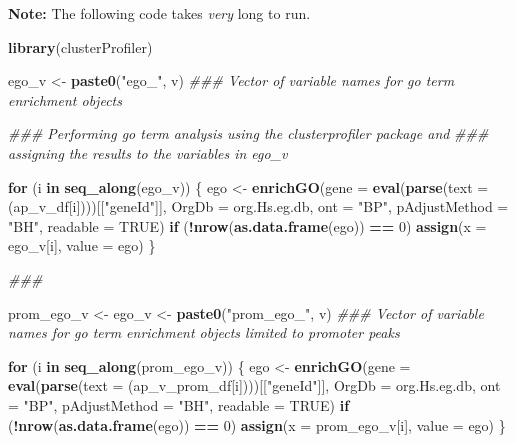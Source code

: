 \documentclass[]{article}
\newenvironment{Shaded}{\begin{snugshade}}{\end{snugshade}}
\newcommand{\CommentTok}[1]{\textcolor[rgb]{0.56,0.35,0.01}{\textit{#1}}}
\newcommand{\ControlFlowTok}[1]{\textcolor[rgb]{0.13,0.29,0.53}{\textbf{#1}}}
\newcommand{\DataTypeTok}[1]{\textcolor[rgb]{0.13,0.29,0.53}{#1}}
\newcommand{\DecValTok}[1]{\textcolor[rgb]{0.00,0.00,0.81}{#1}}
\newcommand{\KeywordTok}[1]{\textcolor[rgb]{0.13,0.29,0.53}{\textbf{#1}}}
\newcommand{\NormalTok}[1]{#1}
\newcommand{\OperatorTok}[1]{\textcolor[rgb]{0.81,0.36,0.00}{\textbf{#1}}}
\newcommand{\OtherTok}[1]{\textcolor[rgb]{0.56,0.35,0.01}{#1}}
\newcommand{\StringTok}[1]{\textcolor[rgb]{0.31,0.60,0.02}{#1}}
\begin{document}
\textbf{Note:} The following code takes \emph{very} long to run.

\begin{Shaded}
\begin{Highlighting}[]
\KeywordTok{library}\NormalTok{(clusterProfiler)}


\NormalTok{ego_v <-}\StringTok{ }\KeywordTok{paste0}\NormalTok{(}\StringTok{"ego_"}\NormalTok{, v)  }\CommentTok{### Vector of variable names for go term enrichment objects}

\CommentTok{### Performing go term analysis using the clusterprofiler package and}
\CommentTok{### assigning the results to the variables in ego_v}

\ControlFlowTok{for}\NormalTok{ (i }\ControlFlowTok{in} \KeywordTok{seq_along}\NormalTok{(ego_v)) \{}
\NormalTok{    ego <-}\StringTok{ }\KeywordTok{enrichGO}\NormalTok{(}\DataTypeTok{gene =} \KeywordTok{eval}\NormalTok{(}\KeywordTok{parse}\NormalTok{(}\DataTypeTok{text =}\NormalTok{ (ap_v_df[i])))[[}\StringTok{"geneId"}\NormalTok{]], }\DataTypeTok{OrgDb =}\NormalTok{ org.Hs.eg.db, }
        \DataTypeTok{ont =} \StringTok{"BP"}\NormalTok{, }\DataTypeTok{pAdjustMethod =} \StringTok{"BH"}\NormalTok{, }\DataTypeTok{readable =} \OtherTok{TRUE}\NormalTok{)}
    \ControlFlowTok{if}\NormalTok{ (}\OperatorTok{!}\KeywordTok{nrow}\NormalTok{(}\KeywordTok{as.data.frame}\NormalTok{(ego)) }\OperatorTok{==}\StringTok{ }\DecValTok{0}\NormalTok{) }
        \KeywordTok{assign}\NormalTok{(}\DataTypeTok{x =}\NormalTok{ ego_v[i], }\DataTypeTok{value =}\NormalTok{ ego)}
\NormalTok{\}}


\CommentTok{### }

\NormalTok{prom_ego_v <-}\StringTok{ }\NormalTok{ego_v <-}\StringTok{ }\KeywordTok{paste0}\NormalTok{(}\StringTok{"prom_ego_"}\NormalTok{, v)  }\CommentTok{### Vector of variable names for go term enrichment objects limited to promoter peaks}



\ControlFlowTok{for}\NormalTok{ (i }\ControlFlowTok{in} \KeywordTok{seq_along}\NormalTok{(prom_ego_v)) \{}
\NormalTok{    ego <-}\StringTok{ }\KeywordTok{enrichGO}\NormalTok{(}\DataTypeTok{gene =} \KeywordTok{eval}\NormalTok{(}\KeywordTok{parse}\NormalTok{(}\DataTypeTok{text =}\NormalTok{ (ap_v_prom_df[i])))[[}\StringTok{"geneId"}\NormalTok{]], }
        \DataTypeTok{OrgDb =}\NormalTok{ org.Hs.eg.db, }\DataTypeTok{ont =} \StringTok{"BP"}\NormalTok{, }\DataTypeTok{pAdjustMethod =} \StringTok{"BH"}\NormalTok{, }\DataTypeTok{readable =} \OtherTok{TRUE}\NormalTok{)}
    \ControlFlowTok{if}\NormalTok{ (}\OperatorTok{!}\KeywordTok{nrow}\NormalTok{(}\KeywordTok{as.data.frame}\NormalTok{(ego)) }\OperatorTok{==}\StringTok{ }\DecValTok{0}\NormalTok{) }
        \KeywordTok{assign}\NormalTok{(}\DataTypeTok{x =}\NormalTok{ prom_ego_v[i], }\DataTypeTok{value =}\NormalTok{ ego)}
\NormalTok{\}}




\end{Highlighting}
\end{Shaded}
\end{document}
